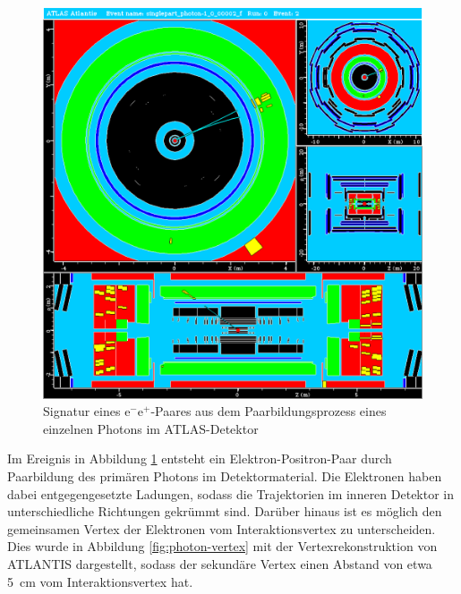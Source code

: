 \documentclass[11pt, a4paper]{article}
\numberwithin{equation}{section}
\begin{document}
\clearpage
\begin{figure}[htbp]
	\centering
	\includegraphics[width=1.0\textwidth]{./data/atlantis/singlepart_events_new/photons/conversion.png}
	\caption{Signatur eines $\mathrm{e}^- \mathrm{e}^+$-Paares aus dem Paarbildungsprozess eines einzelnen Photons im ATLAS-Detektor}
	\label{fig:photon-conversion}
\end{figure}
\vfill
\noindent
Im Ereignis in Abbildung \ref{fig:photon-conversion} entsteht ein Elektron-Positron-Paar durch Paarbildung des primären Photons im Detektormaterial.
Die Elektronen haben dabei entgegengesetzte Ladungen, sodass die Trajektorien im inneren Detektor in unterschiedliche Richtungen gekrümmt sind.
Darüber hinaus ist es möglich den gemeinsamen Vertex der Elektronen vom Interaktionsvertex zu unterscheiden.
Dies wurde in Abbildung \ref{fig:photon-vertex} mit der Vertexrekonstruktion von ATLANTIS dargestellt, sodass der sekundäre Vertex einen Abstand von etwa \SI{5}{\centi\meter} vom Interaktionsvertex hat.
\vfill
\end{document}
